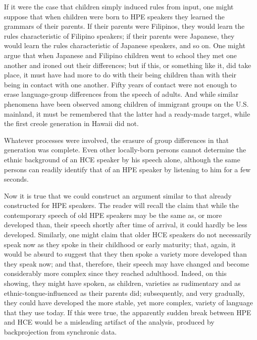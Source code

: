 If it were the case that children simply induced rules from input, one might suppose that when children were born to HPE speakers they learned the grammars of their parents. If their parents were Filipinos, they would learn the rules characteristic of Filipino speakers; if their parents were Japanese, they would learn the rules characteristic of Japanese speakers, and so on. One might argue that when Japanese and Filipino children went to school they met one another and ironed out their differences; but if this, or something like it, did take place, it must have had more to do with their being children than with their being in contact with one another. Fifty years of contact were not enough to erase language-group differences from the speech of adults. And while similar phenomena have been observed among children of immigrant groups on the U.S. mainland, it must be remembered that the latter had a ready-made target, while the first creole generation in Hawaii did not.

Whatever processes were involved, the erasure of group differences in that generation was complete. Even other locally-born persons cannot determine the ethnic background of an HCE speaker by his speech alone, although the same persons can readily identify that of an HPE speaker by listening to him for a few seconds.

Now it is true that we could construct an argument similar to that already constructed for HPE speakers. The reader will recall the claim that while the contemporary speech of old HPE speakers may be the same as, or more developed than, their speech shortly after time of
arrival, it could hardly be less developed. Similarly, one might claim that older HCE speakers do not necessarily speak now as they spoke in their childhood or early maturity; that, again, it would be absurd to suggest that they then spoke a variety more developed than they speak now; and that, therefore, their speech may have changed and become considerably more complex since they reached adulthood. Indeed, on this showing, they might have spoken, as children, varieties as rudimentary and as ethnic-tongue-influenced as their parents did; subsequently, and very gradually, they could have developed the more stable, yet more complex, variety of language that they use today. If this were true, the apparently sudden break between HPE and HCE would be a misleading artifact of the analysis, produced by back\-projection from synchronic data.

